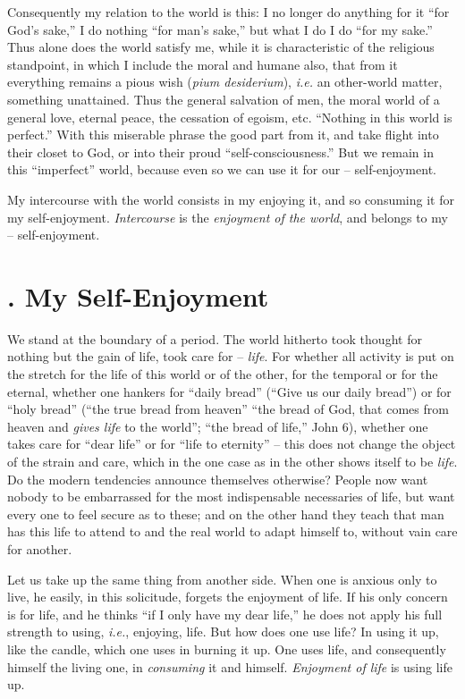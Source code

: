 Consequently my relation to the world is this: I no longer do anything for it 
``for God's sake,'' I do nothing ``for man's sake,'' but what I do I do 
``for my sake.'' Thus alone does the world satisfy me, while it is 
characteristic of the religious standpoint, in which I include the moral and 
humane also, that from it everything remains a pious wish (\textit{pium 
desiderium}), \textit{i.e.} an other-world matter, something unattained. Thus 
the general salvation of men, the moral world of a general love, eternal 
peace, the cessation of egoism, etc. ``Nothing in this world is perfect.'' 
With this miserable phrase the good part from it, and take flight into their 
closet to God, or into their proud ``self-consciousness.'' But we remain in 
this ``imperfect'' world, because even so we can use it for our -- 
self-enjoyment.

My intercourse with the world consists in my enjoying it, and so consuming it 
for my self-enjoyment. \textit{Intercourse} is the \textit{enjoyment of the 
world}, and belongs to my -- self-enjoyment.

\section[3. My Self-Enjoyment]{. My Self-Enjoyment}

We stand at the boundary of a period. The world hitherto took thought for 
nothing but the gain of life, took care for -- \textit{life}. For whether all 
activity is put on the stretch for the life of this world or of the other, for 
the temporal or for the eternal, whether one hankers for ``daily bread'' 
(``Give us our daily bread'') or for ``holy bread'' (``the true bread 
from heaven'' ``the bread of God, that comes from heaven and \textit{gives 
life} to the world''; ``the bread of life,'' John 6), whether one takes 
care for ``dear life'' or for ``life to eternity'' -- this does not change 
the object of the strain and care, which in the one case as in the other shows 
itself to be \textit{life}. Do the modern tendencies announce themselves 
otherwise? People now want nobody to be embarrassed for the most indispensable 
necessaries of life, but want every one to feel secure as to these; and on the 
other hand they teach that man has this life to attend to and the real world 
to adapt himself to, without vain care for another.

Let us take up the same thing from another side. When one is anxious only to 
live, he easily, in this solicitude, forgets the enjoyment of life. If his 
only concern is for life, and he thinks ``if I only have my dear life,'' he 
does not apply his full strength to using, \textit{i.e.}, enjoying, life. But 
how does one use life? In using it up, like the candle, which one uses in 
burning it up. One uses life, and consequently himself the living one, in 
\textit{consuming} it and himself. \textit{Enjoyment of life} is using life 
up.

